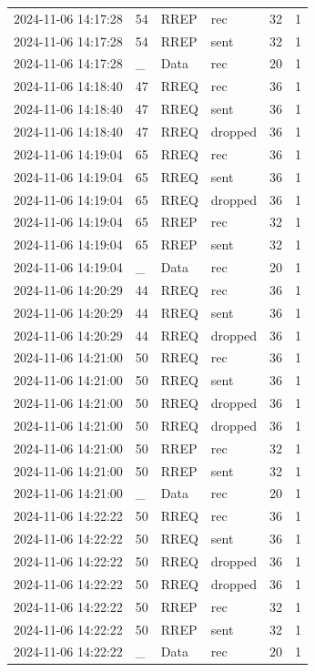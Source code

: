 \documentclass[]{nsm-thesis}
\begin{document}
\begin{longtable}{llllll}
2024-11-06 14:17:28 & 54 & RREP & rec & 32 & 1 \\
2024-11-06 14:17:28 & 54 & RREP & sent & 32 & 1 \\
2024-11-06 14:17:28 & _ & Data & rec & 20 & 1 \\
2024-11-06 14:18:40 & 47 & RREQ & rec & 36 & 1 \\
2024-11-06 14:18:40 & 47 & RREQ & sent & 36 & 1 \\
2024-11-06 14:18:40 & 47 & RREQ & dropped & 36 & 1 \\
2024-11-06 14:19:04 & 65 & RREQ & rec & 36 & 1 \\
2024-11-06 14:19:04 & 65 & RREQ & sent & 36 & 1 \\
2024-11-06 14:19:04 & 65 & RREQ & dropped & 36 & 1 \\
2024-11-06 14:19:04 & 65 & RREP & rec & 32 & 1 \\
2024-11-06 14:19:04 & 65 & RREP & sent & 32 & 1 \\
2024-11-06 14:19:04 & _ & Data & rec & 20 & 1 \\
2024-11-06 14:20:29 & 44 & RREQ & rec & 36 & 1 \\
2024-11-06 14:20:29 & 44 & RREQ & sent & 36 & 1 \\
2024-11-06 14:20:29 & 44 & RREQ & dropped & 36 & 1 \\
2024-11-06 14:21:00 & 50 & RREQ & rec & 36 & 1 \\
2024-11-06 14:21:00 & 50 & RREQ & sent & 36 & 1 \\
2024-11-06 14:21:00 & 50 & RREQ & dropped & 36 & 1 \\
2024-11-06 14:21:00 & 50 & RREQ & dropped & 36 & 1 \\
2024-11-06 14:21:00 & 50 & RREP & rec & 32 & 1 \\
2024-11-06 14:21:00 & 50 & RREP & sent & 32 & 1 \\
2024-11-06 14:21:00 & _ & Data & rec & 20 & 1 \\
2024-11-06 14:22:22 & 50 & RREQ & rec & 36 & 1 \\
2024-11-06 14:22:22 & 50 & RREQ & sent & 36 & 1 \\
2024-11-06 14:22:22 & 50 & RREQ & dropped & 36 & 1 \\
2024-11-06 14:22:22 & 50 & RREQ & dropped & 36 & 1 \\
2024-11-06 14:22:22 & 50 & RREP & rec & 32 & 1 \\
2024-11-06 14:22:22 & 50 & RREP & sent & 32 & 1 \\
2024-11-06 14:22:22 & _ & Data & rec & 20 & 1 \\

\end{longtable}
\end{document}
